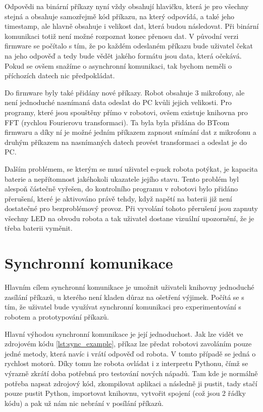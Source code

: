     Odpovědi na binární příkazy nyní vždy obsahují hlavičku, která je pro
    všechny stejná a obsahuje samozřejmě kód příkazu, na který odpovídá, a také
    jeho timestamp, ale hlavně obsahuje i velikost dat, která budou následovat.
    Při binární komunikaci totiž není možné rozpoznat konec přenosu dat. V
    původní verzi firmware se počítalo s tím, že po každém odeslaném příkazu
    bude uživatel čekat na jeho odpověď a tedy bude vědět jakého formátu jsou
    data, která očekává. Pokud se ovšem snažíme o asynchronní komunikaci, tak
    bychom neměli o příchozích datech nic předpokládat.

    Do firmware byly také přidány nové příkazy. Robot obsahuje 3 mikrofony, ale
    není jednoduché nasnímaná data odeslat do PC kvůli jejich velikosti. Pro
    programy, které jsou spouštěny přímo v robotovi, ovšem existuje knihovna
    pro FFT (rychlou Fourierovu transformaci). Ta byla byla přidána do BTcom
    firmwaru a díky ní je možné jedním příkazem zapnout snímání dat z mikrofonu
    a druhým příkazem na nasnímaných datech provést transformaci a odeslat je
    do PC.

    Dalším problémem, se kterým se musí uživatel e-puck robota potýkat, je
    kapacita baterie a nepřítomnost jakéhokoli ukazatele jejího stavu. Tento
    problém byl alespoň částečně vyřešen, do kontrolního programu v robotovi
    bylo přidáno přerušení, které je aktivováno právě tehdy, když napětí na
    baterii již není dostatečné pro bezproblémový provoz. Při vyvolání tohoto
    přerušení jsou zapnuty všechny LED na obvodu robota a tak uživatel dostane
    vizuální upozornění, že je třeba baterii vyměnit.

    \section{Synchronní komunikace}
    \label{btcom:sync}

    Hlavním cílem synchronní komunikace je umožnit uživateli knihovny
    jednoduché zasílání příkazů, u kterého není kladen důraz na ošetření
    výjimek. Počítá se s tím, že uživatel bude využívat synchronní komunikaci
    pro experimentování s robotem a prototypování příkazů.

    Hlavní výhodou synchronní komunikace je její jednoduchost. Jak lze vidět
    ve zdrojovém kódu \ref{lst:sync_example}, příkaz lze předat robotovi
    zavoláním pouze jedné metody, která navíc i vrátí odpověď od robota. V
    tomto případě se jedná o rychlost motorů. Díky tomu lze robota ovládat i z
    interpretu Pythonu, čímž se výrazně zkrátí doba potřebná pro testování
    nových nápadů. Tam kde je normálně potřeba napsat zdrojový kód, zkompilovat
    aplikaci a následně ji pustit, tady stačí pouze pustit Python, importovat
    knihovnu, vytvořit spojení (což jsou 2 řádky kódu) a pak už nám nic nebrání
    v posílání příkazů.

